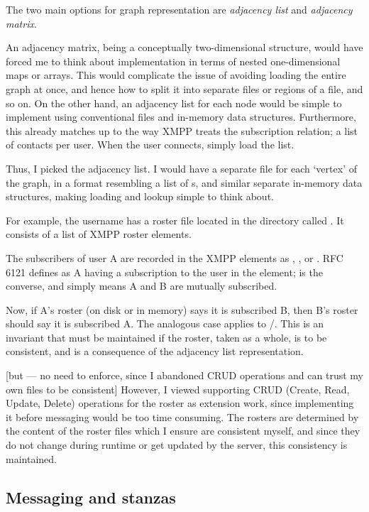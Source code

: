\documentclass[12pt,a4paper,twoside,openright]{report}
\begin{document}
{The two main options for graph representation are \emph{adjacency list} and \emph{adjacency matrix}.

An adjacency matrix, being a conceptually two-dimensional structure, would have forced me to think about implementation in terms of nested one-dimensional maps or arrays. This would complicate the issue of avoiding loading the entire graph at once, and hence how to split it into separate files or regions of a file, and so on. On the other hand, an adjacency list for each node would be simple to implement using conventional files and in-memory data structures. Furthermore, this already matches up to the way XMPP treats the subscription relation; a list of contacts per user. When the user connects, simply load the list.

Thus, I picked the adjacency list. I would have a separate file for each `vertex' of the graph, in a format resembling a list of s, and similar separate in-memory data structures, making loading and lookup simple to think about.

For example, the username  has a roster file located in the  directory called . It consists of a list of XMPP roster  elements.

The subscribers of user A are recorded in the XMPP  elements as , , or . RFC 6121 defines  as A having a subscription to the user in the  element;  is the converse, and  simply means A and B are mutually subscribed.

Now, if A's roster (on disk or in memory) says it is subscribed  B, then B's roster should say it is subscribed  A. The analogous case applies to /. This is an invariant that must be maintained if the roster, taken as a whole, is to be consistent, and is a consequence of the adjacency list representation.

[but --- no need to enforce, since I abandoned CRUD operations and can trust my own files to be consistent]
However, I viewed supporting CRUD (Create, Read, Update, Delete) operations for the roster as extension work, since implementing it before messaging would be too time consuming. The rosters are determined by the content of the roster files which I ensure are consistent myself, and since they do not change during runtime or get updated by the server, this consistency is maintained.

\subsection{Messaging and stanzas}

}
\end{document}
